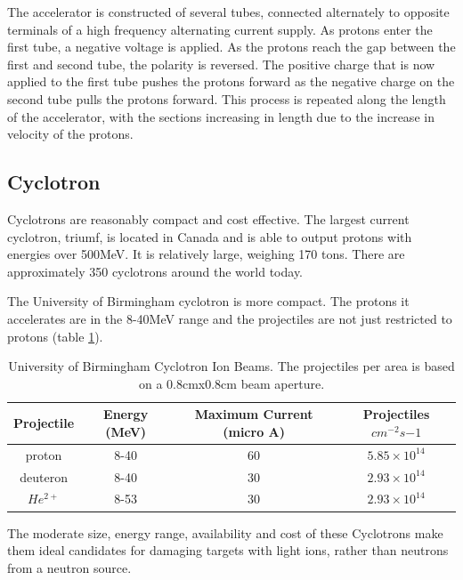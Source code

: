 The accelerator is constructed of several tubes, connected alternately to opposite terminals of a high frequency alternating current supply.  As protons enter the first tube, a negative voltage is applied.  As the protons reach the gap between the first and second tube, the polarity is reversed.  The positive charge that is now applied to the first tube pushes the protons forward as the negative charge on the second tube pulls the protons forward.  This process is repeated along the length of the accelerator, with the sections increasing in length due to the increase in velocity of the protons.




\FloatBarrier
\subsection{Cyclotron}

Cyclotrons are reasonably compact and cost effective.  The largest current cyclotron, \acrlong{triumf}, is located in Canada and is able to output protons with energies over 500MeV.  It is relatively large, weighing 170 tons.  There are approximately 350 cyclotrons\cite{cyclotrons} around the world today.

The University of Birmingham cyclotron is more compact.  The protons it accelerates are in the 8-40MeV range and the projectiles are not just restricted to protons (table \ref{table:mc40projectiles}).


\begin{table}[h]
\begin{center}
\renewcommand{\arraystretch}{1.2}
\begin{tabular}{c c c c}
\hline\hline
Projectile & Energy (MeV) & Maximum Current (micro A) & Projectiles $cm^{-2} s{-1}$\\
\hline\hline 
proton & 8-40 & 60 & $5.85 \times 10^{14}$  \\
deuteron & 8-40 & 30 & $2.93 \times 10^{14}$  \\
$He^{2+}$ & 8-53 & 30 & $2.93 \times 10^{14}$ \\
\hline\hline
\end{tabular}
\end{center}
\caption{University of Birmingham Cyclotron Ion Beams.  The projectiles per area is based on a 0.8cmx0.8cm beam aperture.}
\label{table:mc40projectiles}
\end{table}

The moderate size, energy range, availability and cost of these Cyclotrons make them ideal candidates for damaging targets with light ions, rather than neutrons from a neutron source.


